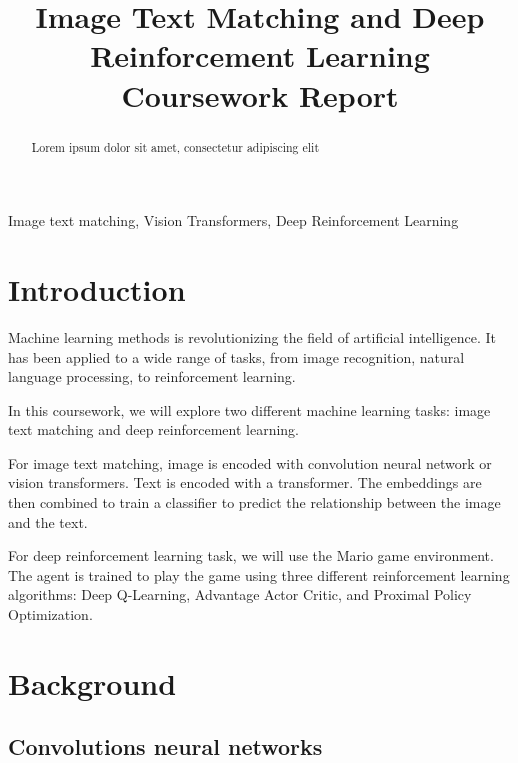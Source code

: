 \documentclass[conference]{IEEEtran}
\begin{document}
\title{Image Text Matching and Deep Reinforcement Learning Coursework Report}

\author{
}

\maketitle

\begin{abstract}
    Lorem ipsum dolor sit amet, consectetur adipiscing elit
\end{abstract}

\begin{IEEEkeywords}
    Image text matching, Vision Transformers, Deep Reinforcement Learning
\end{IEEEkeywords}


\section{Introduction}

Machine learning methods is revolutionizing the field of artificial intelligence. It has been applied to a wide range of tasks, from image recognition, natural language processing, to reinforcement learning.

In this coursework, we will explore two different machine learning tasks: image text matching and deep reinforcement learning.

For image text matching, image is encoded with convolution neural network or vision transformers. Text is encoded with a transformer. The embeddings are then combined to train a classifier to predict the relationship between the image and the text.

For deep reinforcement learning task, we will use the Mario game environment. The agent is trained to play the game using three different reinforcement learning algorithms: Deep Q-Learning, Advantage Actor Critic, and Proximal Policy Optimization.

\section{Background}

\subsection{Convolutions neural networks}
\end{document}
